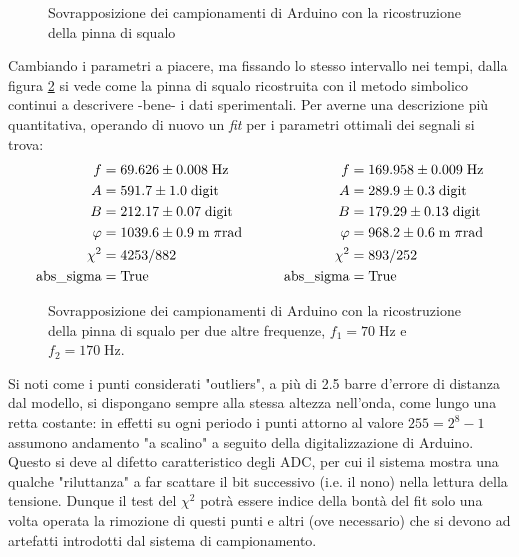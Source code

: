 \documentclass{article}[a4paper, oneside ,11pt]
\begin{document}
\begin{figure}[!htb]
	\centering 
 		\scalebox{0.9}{}
 	\caption{Sovrapposizione dei campionamenti di Arduino con la ricostruzione della pinna di squalo \label{plt:ardfin}}
\end{figure}
Cambiando i parametri a piacere, ma fissando lo stesso intervallo nei tempi, dalla figura \ref{plt:fins} si vede come la pinna di squalo ricostruita con il metodo simbolico continui a descrivere -bene- i dati sperimentali. Per averne una descrizione più quantitativa, operando di nuovo un \emph{fit} per i parametri ottimali dei segnali si trova:
\begin{align*}
f &= 69.626 \pm 0.008 \; \rm Hz  \qquad &f &= 169.958 \pm 0.009 \; \rm Hz \\
A &= 591.7 \pm 1.0 \; \rm digit \qquad &A &= 289.9 \pm 0.3 \; \rm digit \\
B &= 212.17 \pm 0.07 \; \rm digit \qquad &B &= 179.29 \pm 0.13 \; \rm digit \\
\varphi &= 1039.6 \pm 0.9 \; \mathrm{m}\; \pi \si{\radian} \qquad &\varphi &= 968.2 \pm 0.6 \; \mathrm{m}\; \pi \si{\radian} \\
\chi^2 &= 4253/882 \qquad &\chi^2 &= 893/252 \\
\text{abs\_sigma} &= \rm True \qquad &\text{abs\_sigma} &= \rm True
\end{align*}
\begin{figure}[!htb]
	\scalebox{0.55}{}\hfill \scalebox{0.55}{}
 	\caption{Sovrapposizione dei campionamenti di Arduino con la ricostruzione della pinna di squalo per due altre frequenze, $f_1 = 70 \; \si{\hertz}$ e $f_2 = 170 \; \si{\hertz}$. \label{plt:fins}}
\end{figure}
Si noti come i punti considerati "outliers", a più di 2.5 barre d'errore di distanza dal modello, si dispongano sempre alla stessa altezza nell'onda, come lungo una retta costante: in effetti su ogni periodo i punti attorno al valore $255 = 2^8 -1$ assumono andamento "a scalino" a seguito della digitalizzazione di Arduino. Questo si deve al difetto caratteristico degli ADC, per cui il sistema mostra una qualche "riluttanza" a far scattare il bit successivo (i.e. il nono) nella lettura della tensione. Dunque il test del $\chi^2$ potrà essere indice della bontà del fit solo una volta operata la rimozione di questi punti e altri (ove necessario) che si devono ad artefatti introdotti dal sistema di campionamento.
\end{document}
